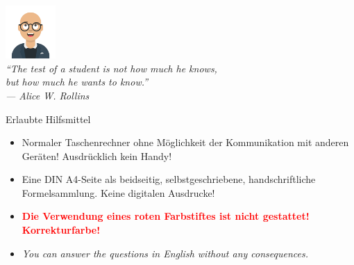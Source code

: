 \documentclass[a4paper, 9pt]{scrartcl}\usepackage[]{graphicx}\usepackage[]{xcolor}
\begin{document}
{\begin{center}
\includegraphics[width = 1.9cm]{avatare/Yuki}\\
\small
\vspace{1.5Ex}
\textit{"`The test of a student is not how much he knows,\\ but how much he wants to know."'\\ --- Alice W. Rollins}
\end{center}}
\maketitle
{}
\thispagestyle{empty}
\clearpage

\begin{graybox}{Erlaubte Hilfsmittel}
  \vspace{1Ex}
  \begin{itemize}
  \item Normaler Taschenrechner ohne Möglichkeit der Kommunikation mit anderen
    Geräten! Ausdrücklich kein Handy!
  \item Eine DIN A4-Seite als beidseitig, selbstgeschriebene,
    handschriftliche Formelsammlung. Keine digitalen Ausdrucke! 
  \item \textbf{\textcolor{red}{Die Verwendung eines roten Farbstiftes ist nicht gestattet! Korrekturfarbe!}}
  \item \textit{You can answer the questions in English without any consequences.}  
  \end{itemize}
\end{graybox}
\vfill
\end{document}
